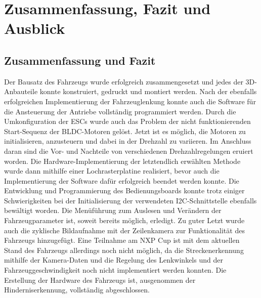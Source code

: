 

\pagestyle{fancy}
\rhead{\thepage} \chead{} 
\cfoot{}

\section{Zusammenfassung, Fazit und Ausblick}\label{Sec11}


\subsection{Zusammenfassung und Fazit}\label{Sec11Sub1}

Der Bausatz des Fahrzeugs wurde erfolgreich zusammengesetzt und jedes der 3D-Anbauteile konnte konstruiert, gedruckt und montiert werden. Nach der ebenfalls erfolgreichen Implementierung der Fahrzeuglenkung konnte auch die Software für die Ansteuerung der Antriebe vollständig programmiert werden. Durch die Umkonfiguration der ESCs wurde auch das Problem der nicht funktionierenden Start-Sequenz der BLDC-Motoren gelöst. Jetzt ist es möglich, die Motoren zu initialisieren, anzusteuern und dabei in der Drehzahl zu variieren. Im Anschluss daran sind die Vor- und Nachteile von verschiedenen Drehzahlregelungen eruiert worden. Die Hardware-Implementierung der letztendlich erwählten Methode wurde dann mithilfe einer Lochrasterplatine realisiert, bevor auch die Implementierung der Software dafür erfolgreich beendet werden konnte. Die Entwicklung und Programmierung des Bedienungsboards konnte trotz einiger Schwierigkeiten bei der Initialisierung der verwendeten \ac{I2C}-Schnittstelle ebenfalls bewältigt worden. Die Menüführung zum Auslesen und Verändern der Fahrzeugparameter ist, soweit bereits möglich, erledigt. Zu guter Letzt wurde auch die zyklische Bildaufnahme mit der Zeilenkamera zur Funktionalität des Fahrzeugs hinzugefügt. Eine Teilnahme am NXP Cup ist mit dem aktuellen Stand des Fahrzeugs allerdings noch nicht möglich, da die Streckenerkennung mithilfe der Kamera-Daten und die Regelung des Lenkwinkels und der Fahrzeuggeschwindigkeit noch nicht implementiert werden konnten. Die Erstellung der Hardware des Fahrzeugs ist, ausgenommen der Hinderniserkennung, vollständig abgeschlossen.\vspace{11pt}

